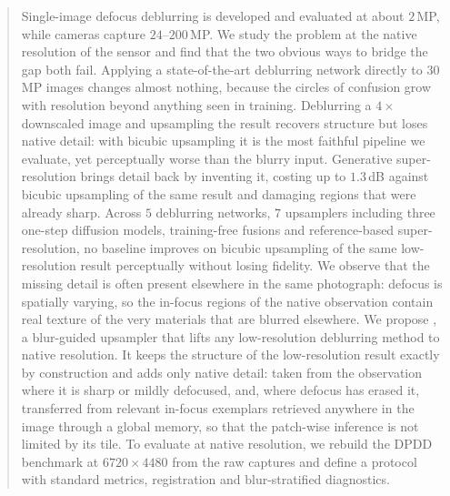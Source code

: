 \begin{abstract}
Single-image defocus deblurring is developed and evaluated at about $2$\,MP, while cameras capture
$24$--$200$\,MP. We study the problem at the native resolution of the sensor and find that the two
obvious ways to bridge the gap both fail. Applying a state-of-the-art deblurring network directly to
$30$\,MP images changes almost nothing, because the circles of confusion grow with resolution beyond
anything seen in training. Deblurring a $4\times$ downscaled image and upsampling the result
recovers structure but loses native detail: with bicubic upsampling it is the most faithful pipeline
we evaluate, yet perceptually worse than the blurry input. Generative super-resolution brings detail
back by inventing it, costing up to $1.3$\,dB against bicubic upsampling of the same result and damaging regions that were already sharp. Across
$5$ deblurring networks, $7$ upsamplers including three one-step diffusion models, training-free
fusions and reference-based super-resolution, no baseline improves on bicubic upsampling of the same
low-resolution result perceptually without losing fidelity. We observe that the missing detail is often
present elsewhere in the same photograph: defocus is spatially varying, so the in-focus regions of
the native observation contain real texture of the very materials that are blurred elsewhere.
We propose \method, a blur-guided upsampler that lifts any low-resolution deblurring method to native
resolution. It keeps the structure of the low-resolution result exactly by construction and adds only
native detail: taken from the observation where it is sharp or mildly defocused, and, where defocus
has erased it, transferred from relevant in-focus exemplars retrieved anywhere in the image through a
global memory, so that the patch-wise inference is not limited by its tile. To evaluate at native resolution, we rebuild the DPDD benchmark at
$6720\times4480$ from the raw captures and define a protocol with standard metrics, registration and
blur-stratified diagnostics. 
\end{abstract}
